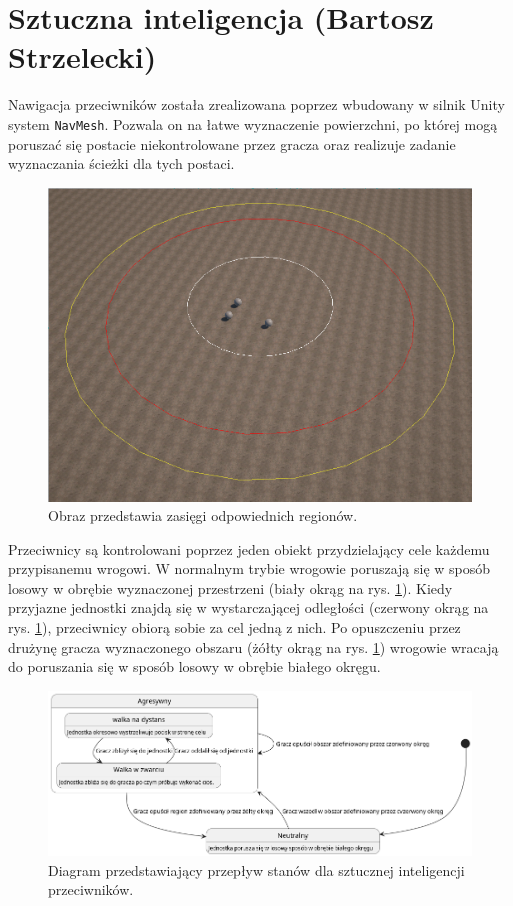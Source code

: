 \section{Sztuczna inteligencja (Bartosz Strzelecki)}\label{s:ai_impl}
Nawigacja przeciwników została zrealizowana poprzez wbudowany w silnik Unity system \texttt{NavMesh}. Pozwala on na łatwe wyznaczenie powierzchni, po której mogą poruszać
się postacie niekontrolowane przez gracza oraz realizuje zadanie wyznaczania ścieżki dla tych postaci.

\begin{figure}[h]
\centering
\includegraphics[width=1\textwidth]{images/ai}
\caption{Obraz przedstawia zasięgi odpowiednich regionów.}
\label{fig:regions}
\end{figure}
\FloatBarrier

Przeciwnicy są kontrolowani poprzez jeden obiekt przydzielający cele każdemu przypisanemu wrogowi. W normalnym trybie wrogowie poruszają się w sposób losowy
w obrębie wyznaczonej przestrzeni (biały okrąg na rys. \ref{fig:regions}). Kiedy przyjazne jednostki znajdą się w wystarczającej odległości (czerwony okrąg na rys. \ref{fig:regions}), przeciwnicy obiorą sobie za cel jedną z nich.
Po opuszczeniu przez drużynę gracza wyznaczonego obszaru (żółty okrąg na rys. \ref{fig:regions}) wrogowie wracają do poruszania się w sposób losowy w obrębie białego okręgu.


\begin{figure}[h]
\centering
\includegraphics[width=1\textwidth]{uml/ai}
\caption{Diagram przedstawiający przepływ stanów dla sztucznej inteligencji przeciwników.}
\end{figure}
